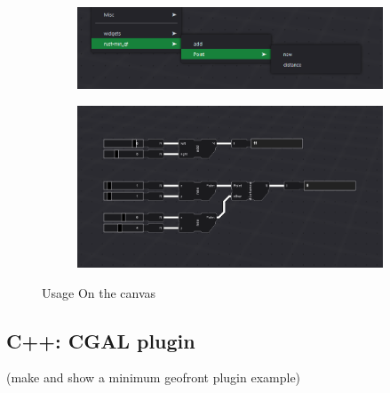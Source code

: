 \begin{note}

  \begin{figure}
    \centering
    \begin{subfigure}[b]{0.45\linewidth}
      \graphicspath{{../../assets/images/6.1.1/}}
      \centering
      \includegraphics[width=\linewidth]{7.PNG}
      \caption{}\label{fig:rust-plugin-on-canvas:1}
    \end{subfigure}%
    \qquad %
    \begin{subfigure}[b]{0.45\linewidth}
      \graphicspath{{../../assets/images/6.1.1/}}
      \centering
      \includegraphics[width=\linewidth]{6.PNG}
      \caption{}\label{fig:rust-plugin-on-canvas:2}
    \end{subfigure}%
    \caption[minimal rust geofront plugin: usage]{Usage On the canvas}
    \label{fig:rust-plugin-on-canvas}
  \end{figure}

\end{note}

\subsection{C++: CGAL plugin}



(make and show a minimum geofront plugin example)

